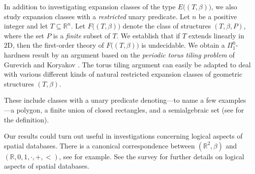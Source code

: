 \documentclass{LMCS}
\theoremstyle{plain}
\newcommand{\rp}{(\mathbb{R}^n,\beta)}
\newcommand{\rpm}{\mathbb{R}^n,\beta}
\newcommand{\rsq}{\mathbb{R}^n}
\begin{document}
%
In addition to investigating expansion classes of the type $E\bigl((T,\beta)\bigr)$, we also
study expansion classes with a \emph{restricted} unary predicate. Let $n$ be a positive integer and let $T\subseteq \rsq$.
Let $F\bigl((T,\beta)\bigr)$ denote the class of structures $(T,\beta,P)$, where the set $P$ is a
\emph{finite} subset of $T$. We establish that 
if $T$ extends linearly in $\mathrm{2D}$, then the first-order theory of $F\bigl((T,\beta)\bigr)$
is undecidable.
%
%
We obtain a $\Pi_1^0$-hardness result by an argument based on the
\emph{periodic torus tiling problem} of Gurevich and Koryakov \cite{GurevichKoryakov:1972}.
%
The torus tiling argument  
can easily be adapted to deal with various different kinds of 
natural restricted expansion classes of geometric structures $(T,\beta)$.
%

%
These include classes with a
unary predicate denoting---to name a few examples---a polygon,
a finite union of closed rectangles, and
a semialgebraic set (see \cite{realalgebraicgeometry} for the definition).
%


%
Our results could turn out useful in investigations concerning logical
aspects of spatial databases. There is a
canonical correspondence between $(\mathbb{R}^2,\beta)$ and
$(\mathbb{R},0,1,\cdot,+,<)$,
see \cite{Gyssens:1999} for example. 
See the survey \cite{KujpersVandenBussche} for further details on logical
aspects of spatial databases.
%
\end{document}
